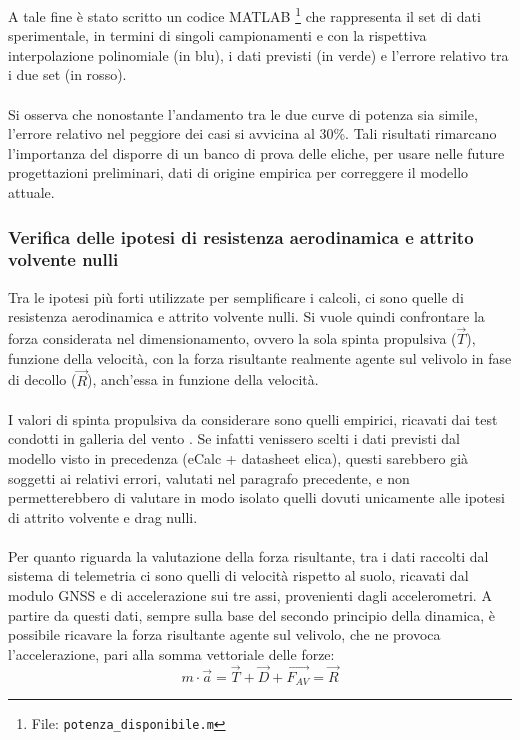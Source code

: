 \documentclass[12pt]{article}
\begin{document}
\noindent
A tale fine è stato scritto un codice MATLAB \footnote{File: \texttt{potenza\_disponibile.m}} che rappresenta il set di dati sperimentale, in termini di singoli campionamenti e con la rispettiva interpolazione polinomiale (in blu), i dati previsti (in verde) e l'errore relativo tra i due set (in rosso). 
\\\\
Si osserva che nonostante l'andamento tra le due curve di potenza sia simile, l'errore relativo nel peggiore dei casi si avvicina al 30\%. Tali risultati rimarcano l'importanza del disporre di un banco di prova delle eliche, per usare nelle future progettazioni preliminari, dati di origine empirica per correggere il modello attuale.

\subsubsection{Verifica delle ipotesi di resistenza aerodinamica e attrito volvente nulli}
Tra le ipotesi più forti utilizzate per semplificare i calcoli, ci sono quelle di resistenza aerodinamica e attrito volvente nulli. Si vuole quindi confrontare la forza considerata nel dimensionamento, ovvero la sola spinta propulsiva ($\overrightarrow{T}$), funzione della velocità, con la forza risultante realmente agente sul velivolo in fase di decollo ($\overrightarrow{R}$), anch'essa in funzione della velocità. 
\\\\
I valori di spinta propulsiva da considerare sono quelli empirici, ricavati dai test condotti in galleria del vento \cite{windtunnel}. Se infatti venissero scelti i dati previsti dal modello visto in precedenza (eCalc + datasheet elica), questi sarebbero già soggetti ai relativi errori, valutati nel paragrafo precedente, e non permetterebbero di valutare in modo isolato quelli dovuti unicamente alle ipotesi di attrito volvente e drag nulli.
\\\\
Per quanto riguarda la valutazione della forza risultante, tra i dati raccolti dal sistema di telemetria ci sono quelli di velocità rispetto al suolo, ricavati dal modulo GNSS e di accelerazione sui tre assi, provenienti dagli accelerometri. A partire da questi dati, sempre sulla base del secondo principio della dinamica, è possibile ricavare la forza risultante agente sul velivolo, che ne provoca l'accelerazione, pari alla somma vettoriale delle forze:
\begin{equation}
m \cdot \overrightarrow{a} = \overrightarrow{T} + \overrightarrow{D} + \overrightarrow{F_{AV}} = \overrightarrow{R}
\end{equation}
\end{document}
